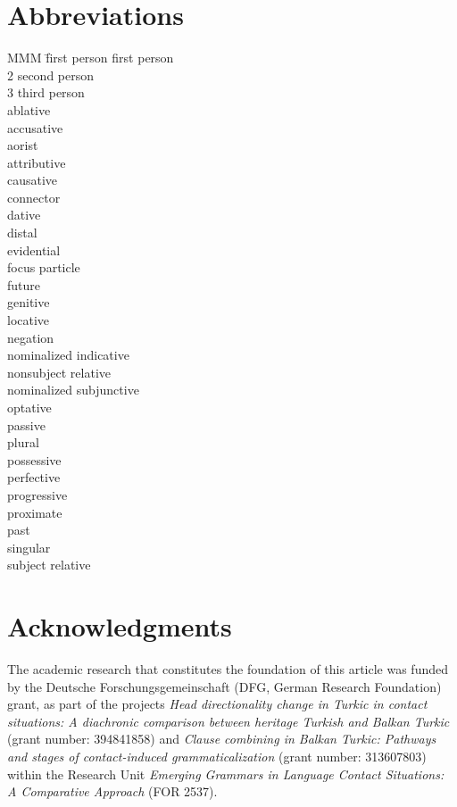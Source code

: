 \documentclass[output=paper,colorlinks,citecolor=brown]{langscibook}
\begin{document}
\section*{Abbreviations}
\begin{multicols}{2}
\begin{tabbing}
MMM \= first person \> first person\\
2 \> second person\\
3 \> third person\\
\Abl \> ablative\\
\Acc \> accusative\\
\Aor \> aorist\\
\Attr \> attributive\\
\Caus \> causative\\
\Conn \> connector\\
\Dat \> dative\\
\Dist \> distal\\
\Evid \> evidential\\
\Foc \> focus particle\\
\Fut \> future\\
\Gen \> genitive\\
\Loc \> locative\\
\Neg \> negation\\
\Nind \> nominalized indicative\\
\Nsrel \> nonsubject relative\\
\Nsub \> nominalized subjunctive\\
\Opt \> optative\\
\Pass \> passive\\
\Pl \> plural\\
\Poss \> possessive\\
\Prf \> perfective\\
\Prog \> progressive\\
\Prox \> proximate\\
\Pst \> past\\
\Sg \> singular\\
\Srel \> subject relative
\end{tabbing}
\end{multicols}

\section*{Acknowledgments}

The academic research that constitutes the foundation of this article was funded by the Deutsche Forschungsgemeinschaft (DFG, German Research Foundation) grant, as part of the projects \textit{Head directionality change in Turkic in contact situations: A diachronic comparison between heritage Turkish and Balkan Turkic} (grant number: 394841858) and \textit{Clause combining in Balkan Turkic: Pathways and stages of contact-induced grammaticalization} (grant number: 313607803) within the Research Unit \textit{Emerging Grammars in Language Contact Situations: A Comparative Approach} (FOR 2537).
\end{document}
